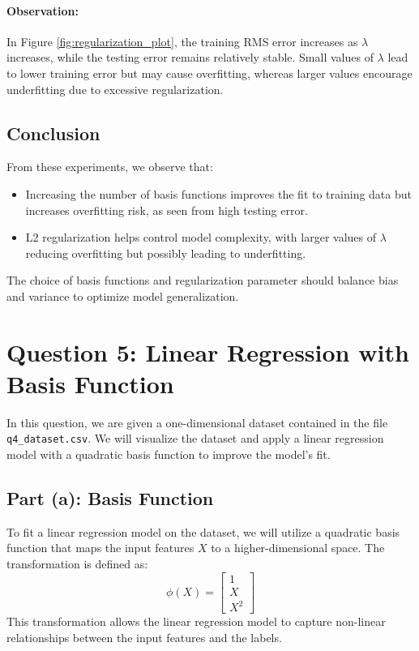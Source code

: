 \documentclass{article}
\begin{document}
	\paragraph{Observation:}
	In Figure \ref{fig:regularization_plot}, the training RMS error increases as \(\lambda\) increases, while the testing error remains relatively stable. Small values of \(\lambda\) lead to lower training error but may cause overfitting, whereas larger values encourage underfitting due to excessive regularization.
	
	\subsection*{Conclusion}
	From these experiments, we observe that:
	\begin{itemize}
		\item Increasing the number of basis functions improves the fit to training data but increases overfitting risk, as seen from high testing error.
		\item L2 regularization helps control model complexity, with larger values of \(\lambda\) reducing overfitting but possibly leading to underfitting.
	\end{itemize}
	The choice of basis functions and regularization parameter should balance bias and variance to optimize model generalization.
	
	\newpage
	\section*{Question 5: Linear Regression with Basis Function}
	
	In this question, we are given a one-dimensional dataset contained in the file \texttt{q4\_dataset.csv}. We will visualize the dataset and apply a linear regression model with a quadratic basis function to improve the model's fit.
	
	\subsection*{Part (a): Basis Function}
	To fit a linear regression model on the dataset, we will utilize a quadratic basis function that maps the input features \( X \) to a higher-dimensional space. The transformation is defined as:
	\[
	\phi(X) = \begin{bmatrix}
		1 \\
		X \\
		X^2
	\end{bmatrix}
	\]
	This transformation allows the linear regression model to capture non-linear relationships between the input features and the labels.
	
\end{document}
